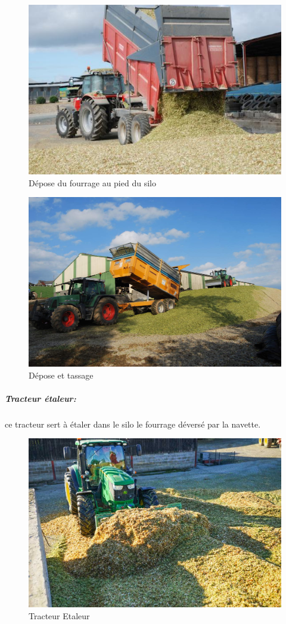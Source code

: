 \documentclass[12pt,a4paper]{report}
\begin{document}
\begin{figure}[H]
	\centering
	\includegraphics[width=0.7\linewidth]{img/navettedepose}
	\caption{Dépose du fourrage au pied du silo}
	\label{fig:navettedepose}
\end{figure}

\begin{figure}[H]
	\centering
	\includegraphics[width=0.7\linewidth]{img/deposetassage}
	\caption{Dépose et tassage}
	\label{fig:deposetassage}
\end{figure}


\subparagraph{Tracteur étaleur:}ce tracteur sert à étaler dans le silo le fourrage déversé par la navette.

\begin{figure}[H]
	\centering
	\includegraphics[width=0.7\linewidth]{img/etalage}
	\caption{Tracteur Etaleur}
	\label{fig:etalage}
\end{figure}
\end{document}
